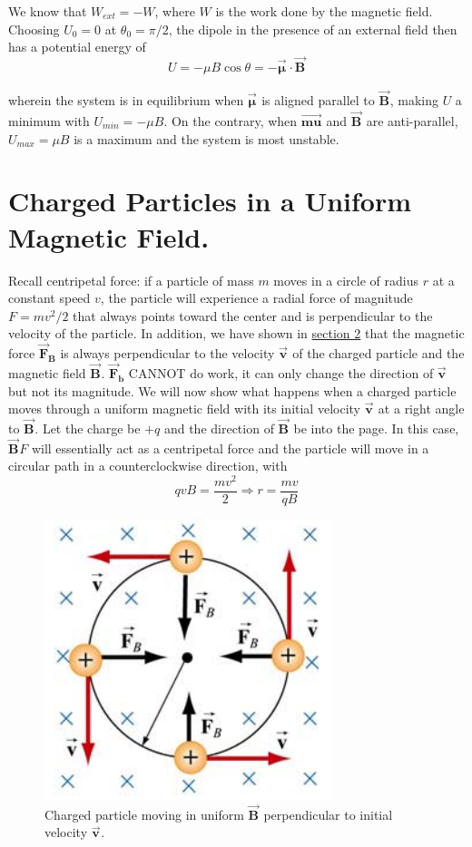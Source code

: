 \documentclass[11pt, letterpaper]{article}
\theoremstyle{definition}
\theoremstyle{remark}
\newcommand{\bv}[2][]{\bm{\vec{#2}_{#1}}}
\begin{document}
We know that $W_{ext} = -W$, where $W$ is the work done by the magnetic field. Choosing $U_0 = 0$ at $\theta_0=\pi/2$, the dipole in the presence of an external field then has a potential energy of 
\begin{equation}\label{eqn:magnetic-dipole-energy}
	\boxed{U = -\mu B \cos\theta = -\bv{\mu}\cdot\bv{B}}
\end{equation}

wherein the system is in equilibrium when $\bv{\mu}$ is aligned parallel to $\bv{B}$, making $U$ a minimum with $U_{min} = -\mu B$. On the contrary, when $\bv{mu}$ and $\bv{B}$ are anti-parallel, $U_{max} = \mu B$ is a maximum and the system is most unstable.

\section{Charged Particles in a Uniform Magnetic Field.}\label{sec:particle}
Recall centripetal force: if a particle of mass $m$ moves in a circle of radius $r$ at a constant speed $v$, the particle will experience a radial force of magnitude $F = mv^2/2$ that always points toward the center and is perpendicular to the velocity of the particle. In addition, we have shown in \hyperref[sec:def]{section 2} that the magnetic force $\bv[B]{F}$ is always perpendicular to the velocity $\bv{v}$ of the charged particle and the magnetic field $\bv{B}$. $\bv[b]{F}$ CANNOT do work, it can only change the direction of $\bv{v}$ but not its magnitude. We will now show what happens when a charged particle moves through a uniform magnetic field with its initial velocity $\bv{v}$ at a right angle to $\bv{B}$. Let the charge be $+q$ and the direction of $\bv{B}$ be into the page. In this case, $\bv{B}{F}$ will essentially act as a centripetal force and the particle will move in a circular path in a counterclockwise direction, with \[qvB=\frac{mv^2}{2}\Rightarrow\boxed{r=\frac{mv}{qB}}\]
\begin{figure}[h!]
	\centering
	\includegraphics[scale=0.7]{centripetal}
	\caption{Charged particle moving in uniform $\bv{B}$ perpendicular to initial velocity $\bv{v}$.}
	\label{fig:centripetal}
\end{figure}
\end{document}
